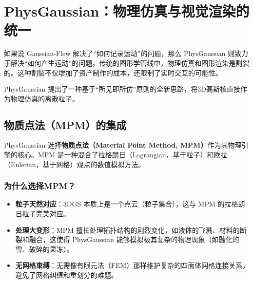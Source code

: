 
\chapter{PhysGaussian：物理仿真与视觉渲染的统一}
\label{cha:physgaussian}

如果说 Gaussian-Flow 解决了“如何记录运动”的问题，那么 PhysGaussian 则致力于解决“如何产生运动”的问题。传统的图形学管线中，物理仿真和图形渲染是割裂的。这种割裂不仅增加了资产制作的成本，还限制了实时交互的可能性。

PhysGaussian 提出了一种基于“所见即所仿”原则的全新思路\cite{xie2023physgaussian_arxiv,xie2024physgaussian_cvpr,xie2024physgaussian_github}，将3D高斯核直接作为物理仿真的离散粒子。

\section{物质点法（MPM）的集成}
PhysGaussian 选择\textbf{物质点法（Material Point Method, MPM）}作为其物理引擎的核心。MPM 是一种混合了拉格朗日（Lagrangian，基于粒子）和欧拉（Eulerian，基于网格）观点的数值模拟方法。

\subsection{为什么选择MPM？}
\begin{itemize}
	\item \textbf{粒子天然对应}：3DGS 本质上是一个点云（粒子集合），这与 MPM 的拉格朗日粒子完美对应。
	\item \textbf{处理大变形}：MPM 擅长处理拓扑结构的剧烈变化，如液体的飞溅、材料的断裂和融合，这使得 PhysGaussian 能够模拟极其复杂的物理现象（如融化的雪、破碎的果冻）\cite{xie2024physgaussian_cvpr,li2024physdreamer_eccv}。
	\item \textbf{无网格束缚}：无需像有限元法（FEM）那样维护复杂的四面体网格连接关系，避免了网格纠缠和重划分的难题。
\end{itemize}

